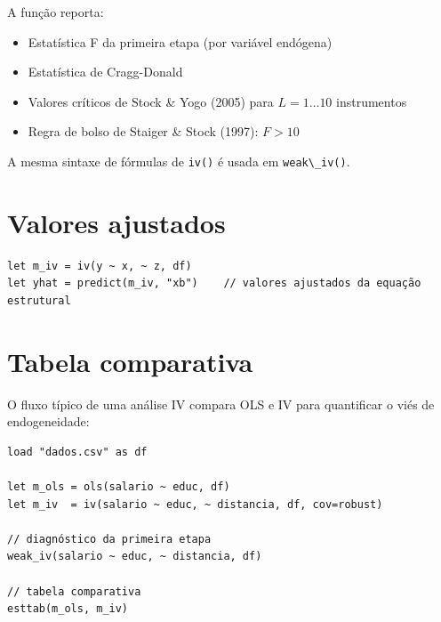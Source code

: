 A função reporta:
\begin{itemize}
  \item Estatística F da primeira etapa (por variável endógena)
  \item Estatística de Cragg-Donald
  \item Valores críticos de Stock \& Yogo (2005) para $L = 1\ldots10$ instrumentos
  \item Regra de bolso de Staiger \& Stock (1997): $F > 10$
\end{itemize}

\begin{nota}
  A mesma sintaxe de fórmulas de \lstinline{iv()} é usada em \lstinline{weak\_iv()}.
\end{nota}

\section{Valores ajustados}

\begin{lstlisting}
let m_iv = iv(y ~ x, ~ z, df)
let yhat = predict(m_iv, "xb")    // valores ajustados da equação estrutural
\end{lstlisting}

\section{Tabela comparativa}

O fluxo típico de uma análise IV compara OLS e IV para quantificar o viés de
endogeneidade:

\begin{lstlisting}[caption={Fluxo completo de análise IV}]
load "dados.csv" as df

let m_ols = ols(salario ~ educ, df)
let m_iv  = iv(salario ~ educ, ~ distancia, df, cov=robust)

// diagnóstico da primeira etapa
weak_iv(salario ~ educ, ~ distancia, df)

// tabela comparativa
esttab(m_ols, m_iv)
\end{lstlisting}
